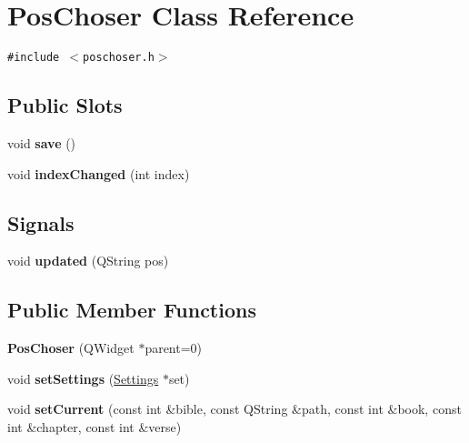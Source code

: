 \hypertarget{classPosChoser}{
\section{PosChoser Class Reference}
\label{classPosChoser}
}
{\tt \#include $<$poschoser.h$>$}

\subsection*{Public Slots}
\begin{CompactItemize}
\item 
\hypertarget{classPosChoser_4726cbeea4eafc2c7e63d770b97f8773}{
void \textbf{save} ()}
\label{classPosChoser_4726cbeea4eafc2c7e63d770b97f8773}

\item 
\hypertarget{classPosChoser_45c4c1de98777d1d252990802c911c06}{
void \textbf{indexChanged} (int index)}
\label{classPosChoser_45c4c1de98777d1d252990802c911c06}

\end{CompactItemize}
\subsection*{Signals}
\begin{CompactItemize}
\item 
\hypertarget{classPosChoser_8c1c6c95229ac1138db6b8c36dc2fe95}{
void \textbf{updated} (QString pos)}
\label{classPosChoser_8c1c6c95229ac1138db6b8c36dc2fe95}

\end{CompactItemize}
\subsection*{Public Member Functions}
\begin{CompactItemize}
\item 
\hypertarget{classPosChoser_d6bb87252ef0c2a0e32b7e9a17a79668}{
\textbf{PosChoser} (QWidget $\ast$parent=0)}
\label{classPosChoser_d6bb87252ef0c2a0e32b7e9a17a79668}

\item 
\hypertarget{classPosChoser_007b0b5f78c0e4adbacb1bfceb7eca52}{
void \textbf{setSettings} (\hyperlink{classSettings}{Settings} $\ast$set)}
\label{classPosChoser_007b0b5f78c0e4adbacb1bfceb7eca52}

\item 
\hypertarget{classPosChoser_27b2649ab2e710d47ab175e5ac485f6c}{
void \textbf{setCurrent} (const int \&bible, const QString \&path, const int \&book, const int \&chapter, const int \&verse)}
\label{classPosChoser_27b2649ab2e710d47ab175e5ac485f6c}

\end{CompactItemize}
